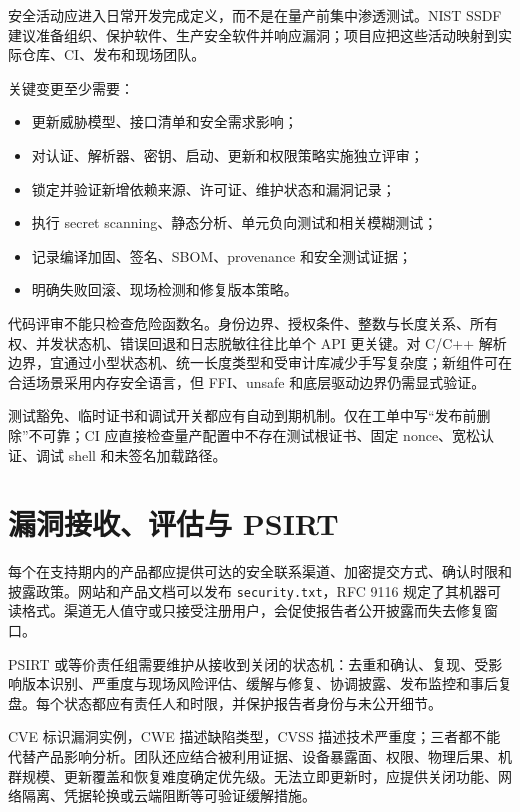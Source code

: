安全活动应进入日常开发完成定义，而不是在量产前集中渗透测试。NIST SSDF 建议准备组织、保护软件、生产安全软件并响应漏洞\cite{nist-ssdf}；项目应把这些活动映射到实际仓库、CI、发布和现场团队。

关键变更至少需要：

\begin{itemize}
  \item 更新威胁模型、接口清单和安全需求影响；
  \item 对认证、解析器、密钥、启动、更新和权限策略实施独立评审；
  \item 锁定并验证新增依赖来源、许可证、维护状态和漏洞记录；
  \item 执行 secret scanning、静态分析、单元负向测试和相关模糊测试；
  \item 记录编译加固、签名、SBOM、provenance 和安全测试证据；
  \item 明确失败回滚、现场检测和修复版本策略。
\end{itemize}

代码评审不能只检查危险函数名。身份边界、授权条件、整数与长度关系、所有权、并发状态机、错误回退和日志脱敏往往比单个 API 更关键。对 C/C++ 解析边界，宜通过小型状态机、统一长度类型和受审计库减少手写复杂度；新组件可在合适场景采用内存安全语言，但 FFI、unsafe 和底层驱动边界仍需显式验证。

测试豁免、临时证书和调试开关都应有自动到期机制。仅在工单中写“发布前删除”不可靠；CI 应直接检查量产配置中不存在测试根证书、固定 nonce、宽松认证、调试 shell 和未签名加载路径。

\section{漏洞接收、评估与 PSIRT}

每个在支持期内的产品都应提供可达的安全联系渠道、加密提交方式、确认时限和披露政策。网站和产品文档可以发布 \texttt{security.txt}，RFC 9116 规定了其机器可读格式\cite{rfc9116-securitytxt}。渠道无人值守或只接受注册用户，会促使报告者公开披露而失去修复窗口。

PSIRT 或等价责任组需要维护从接收到关闭的状态机：去重和确认、复现、受影响版本识别、严重度与现场风险评估、缓解与修复、协调披露、发布监控和事后复盘。每个状态都应有责任人和时限，并保护报告者身份与未公开细节。

CVE 标识漏洞实例，CWE 描述缺陷类型，CVSS 描述技术严重度；三者都不能代替产品影响分析。团队还应结合被利用证据、设备暴露面、权限、物理后果、机群规模、更新覆盖和恢复难度确定优先级。无法立即更新时，应提供关闭功能、网络隔离、凭据轮换或云端阻断等可验证缓解措施。

